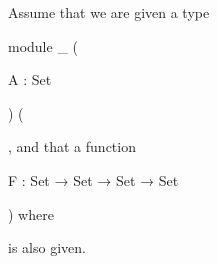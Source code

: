 \documentclass{article}
\begin{document}
Assume that we are given a type
%
\begin{code}[inline=False,hide=true]
  module _ (
\end{code}
\begin{code}[hide,inline,hide=false]
    A : Set
\end{code}
\begin{code}[hide=false,hide=True]
    ) (
\end{code}
%
,
and that a function
%
\begin{code}[inline*]
    F : Set → Set → Set → Set
\end{code}
\begin{code}[hide]
    ) where
\end{code}
%
is also given.
\end{document}
